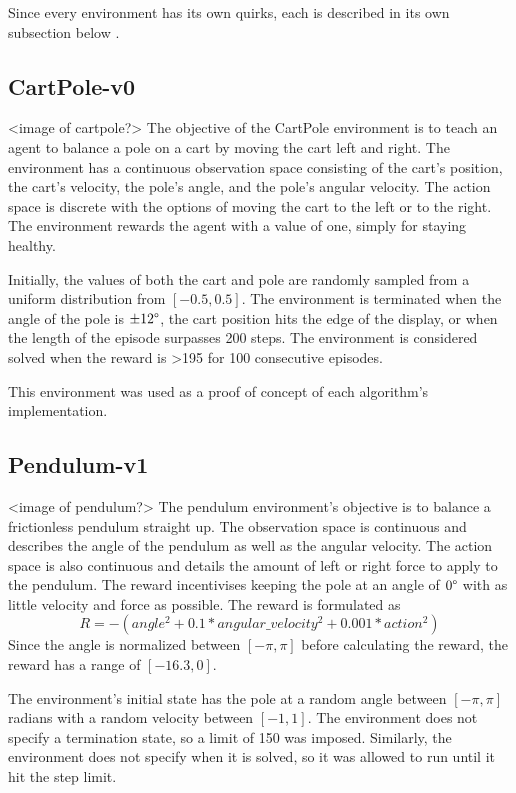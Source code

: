 \documentclass[conference]{IEEEtran}
\begin{document}
Since every environment has its own quirks, each is described in its own subsection below \cite {gym_source}.

\subsection{CartPole-v0}

<image of cartpole?>
The objective of the CartPole environment is to teach an agent to balance a pole on a cart by moving the cart left and
right. The environment has a continuous observation space consisting of the cart's position, the cart's velocity, the
pole's angle, and the pole's angular velocity. The action space is discrete with the options of moving the cart to the
left or to the right. The environment rewards the agent with a value of one, simply for staying healthy.

Initially, the values of both the cart and pole are randomly sampled from a uniform distribution from $[-0.5, 0.5]$. The
environment is terminated when the angle of the pole is $\pm12\degree$, the cart position hits the edge of the display,
or when the length of the episode surpasses 200 steps. The environment is considered solved when the reward is
\textgreater 195 for 100 consecutive episodes.

This environment was used as a proof of concept of each algorithm's implementation.

\subsection{Pendulum-v1}

<image of pendulum?>
The pendulum environment's objective is to balance a frictionless pendulum straight up. The observation space is
continuous and describes the angle of the pendulum as well as the angular velocity. The action space is also continuous
and details the amount of left or right force to apply to the pendulum. The reward incentivises keeping the pole at an
angle of $0\degree$ with as little velocity and force as possible. The reward is formulated as
$$
R = -(angle ^{2} + 0.1 * angular\_velocity ^ {2} + 0.001 * action ^ {2})
$$
Since the angle is normalized between $[-\pi, \pi]$ before calculating the reward, the reward has a range of
$[-16.3, 0]$.

The environment's initial state has the pole at a random angle between $[-\pi, \pi]$ radians with a random velocity
between $[-1, 1]$. The environment does not specify a termination state, so a limit of 150 was imposed. Similarly, the
environment does not specify when it is solved, so it was allowed to run until it hit the step limit.
\end{document}
